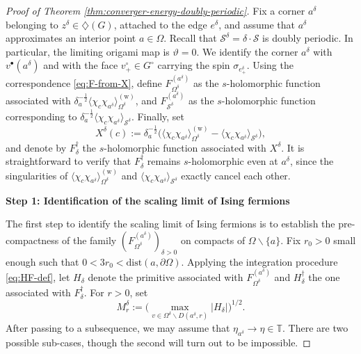 \documentclass[reqno]{amsart}
\numberwithin{equation}{section}
\theoremstyle{definition}
\theoremstyle{remark}
\newcommand\cS{\mathcal{S}}
\begin{document}
\begin{proof}[Proof of Theorem \ref{thm:converger-energy-doubly-periodic}]
Fix a corner $a^\delta$ belonging to $z^\delta \in \diamondsuit(G)$, attached to the edge $e^\delta$, and assume that $a^\delta$ approximates an interior point $a \in \Omega$. Recall that $\cS^\delta = \delta \cdot \cS$ is doubly periodic. In particular, the limiting origami map is $\vartheta =0 $. We identify the corner $a^\delta$ with $v^\bullet(a^\delta)$ and with the face $v^\circ_+ \in G^\circ$ carrying the spin $\sigma_{e^\delta_+}$. Using the correspondence \eqref{eq:F-from-X}, define $F^{(a^\delta)}_{\Omega^\delta}$ as the $s$-holomorphic function associated with $\delta_a^{-\frac12}\langle \chi_c \chi_{a^\delta} \rangle_{\Omega^\delta}^{(\mathrm{w})}$, and $F^{(a^\delta)}_{\cS^\delta}$ as the $s$-holomorphic function corresponding to $\delta_a^{-\frac12}\langle \chi_c \chi_{a^\delta} \rangle_{\cS^\delta}$. Finally, set
\[
X^\delta(c) := \delta_a^{-\frac12}\big(\langle \chi_c \chi_{a^\delta} \rangle_{\Omega^\delta}^{(\mathrm{w})} - \langle \chi_c \chi_{a^\delta} \rangle_{\cS^\delta}\big),
\]
and denote by $F^\dagger_\delta$ the $s$-holomorphic function associated with $X^\delta$. It is straightforward to verify that $F^\dagger_\delta$ remains $s$-holomorphic even at $a^\delta$, since the singularities of $\langle \chi_c \chi_{a^\delta} \rangle_{\Omega^\delta}^{(\mathrm{w})}$ and $\langle \chi_c \chi_{a^\delta} \rangle_{\cS^\delta}$ exactly cancel each other. 

\textbf{Step 1: Identification of the scaling limit of Ising fermions}

The first step to identify the scaling limit of Ising fermions is to establish the pre-compactness of the family $(F^{(a^\delta)}_{\Omega^\delta})_{\delta>0}$ on compacts of $\Omega \backslash \{ a \} $. Fix $r_0>0$ small enough such that $0< 3r_0 < \textrm{dist}(a,\partial \Omega)$. Applying the integration procedure \eqref{eq:HF-def}, let $H_\delta$ denote the primitive associated with $F^{(a^\delta)}_{\Omega^\delta}$ and $H^\dagger_\delta$ the one associated with $F^\dagger_\delta$. For $r > 0$, set
\[
M_r^\delta := \big(\max_{v \in \Omega^\delta \backslash D(a^\delta, r)} |H_\delta|\big)^{1/2}.
\]
After passing to a subsequence, we may assume that $\eta_{a^\delta} \to \eta \in \mathbb{T}$. There are two possible sub-cases, though the second will turn out to be impossible.


\end{proof}
\end{document}
